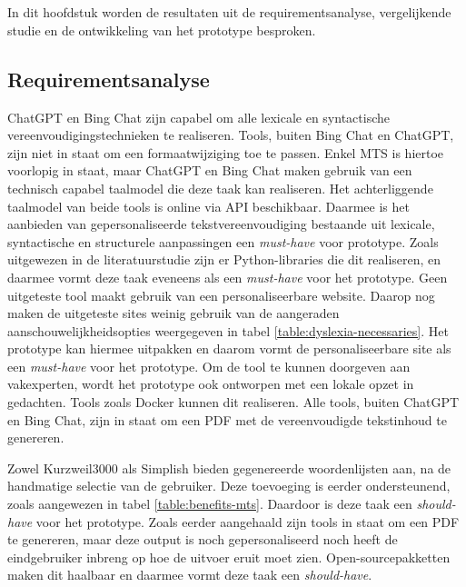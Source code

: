 \chapter{}%
\label{ch:resultaten}

In dit hoofdstuk worden de resultaten uit de requirementsanalyse, vergelijkende studie en de ontwikkeling van het prototype besproken. 

\section{Requirementsanalyse}

ChatGPT en Bing Chat zijn capabel om alle lexicale en syntactische vereenvoudigingstechnieken te realiseren. Tools, buiten Bing Chat en ChatGPT, zijn niet in staat om een formaatwijziging toe te passen. Enkel MTS is hiertoe voorlopig in staat, maar ChatGPT en Bing Chat maken gebruik van een technisch capabel taalmodel die deze taak kan realiseren. Het achterliggende taalmodel van beide tools is online via API beschikbaar. Daarmee is het aanbieden van gepersonaliseerde tekstvereenvoudiging bestaande uit lexicale, syntactische en structurele aanpassingen een \textit{must-have} voor prototype. Zoals uitgewezen in de literatuurstudie zijn er Python-libraries die dit realiseren, en daarmee vormt deze taak eveneens als een \textit{must-have} voor het prototype. Geen uitgeteste tool maakt gebruik van een personaliseerbare website. Daarop nog maken de uitgeteste sites weinig gebruik van de aangeraden aanschouwelijkheidsopties weergegeven in tabel \ref{table:dyslexia-necessaries}. Het prototype kan hiermee uitpakken en daarom vormt de personaliseerbare site als een \textit{must-have} voor het prototype. Om de tool te kunnen doorgeven aan vakexperten, wordt het prototype ook ontworpen met een lokale opzet in gedachten. Tools zoals Docker kunnen dit realiseren. Alle tools, buiten ChatGPT en Bing Chat, zijn in staat om een PDF met de vereenvoudigde tekstinhoud te genereren.

\medspace

Zowel Kurzweil3000 als Simplish bieden gegenereerde woordenlijsten aan, na de handmatige selectie van de gebruiker. Deze toevoeging is eerder ondersteunend, zoals aangewezen in tabel \ref{table:benefits-mts}. Daardoor is deze taak een \textit{should-have} voor het prototype. Zoals eerder aangehaald zijn tools in staat om een PDF te genereren, maar deze output is noch gepersonaliseerd noch heeft de eindgebruiker inbreng op hoe de uitvoer eruit moet zien. Open-sourcepakketten maken dit haalbaar en daarmee vormt deze taak een \textit{should-have}.

